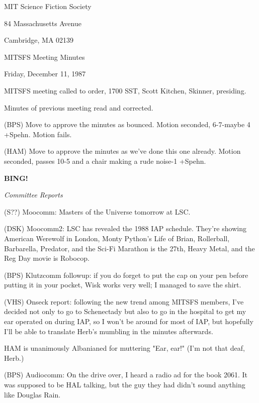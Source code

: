 \documentclass[12pt]{article}
\newcommand{\bing}{{\bf BING!} }
\newcommand{\goto}[1]{\bing \vskip 12pt \centerline{{\em{#1}}}}
\begin{document}
\begin{center}

MIT Science Fiction Society 

84 Massachusetts Avenue

Cambridge, MA 02139

\vspace{12pt}

MITSFS Meeting Minutes 

Friday, December 11, 1987

\end{center}
 
\vspace{18pt}

\setlength{\parskip}{6pt}

\noindent
MITSFS meeting called to order, 1700 SST,
Scott Kitchen, Skinner, presiding.

Minutes of previous meeting read and corrected.

(BPS) Move to approve the minutes as bounced. Motion seconded, 6-7-maybe 4 +Spehn. Motion fails.

(HAM) Move to approve the minutes as we've done this one already. Motion seconded, passes 10-5 and a chair making a rude noise-1 +Spehn.

\goto{Committee Reports}

(S??) Moocomm: Masters of the Universe tomorrow at LSC.

(DSK) Moocomm2: LSC has revealed the 1988 IAP schedule. They're showing American Werewolf in London, Monty Python's Life of Brian, Rollerball, Barbarella, Predator, and the Sci-Fi Marathon is the 27th, Heavy Metal, and the Reg Day movie is Robocop.

(BPS) Klutzcomm followup: if you do forget to put the cap on your pen before putting it in your pocket, Wisk works very well; I managed to save the shirt.

(VHS) Onseck report: following the new trend among MITSFS members, I've decided not only to go to Schenectady but also to go in the hospital to get my ear operated on during IAP, so I won't be around for most of IAP, but hopefully I'll be able to translate Herb's mumbling in the minutes afterwards.

HAM is unanimously Albanianed for muttering "Ear, ear!" (I'm not that deaf, Herb.)

(BPS) Audiocomm: On the drive over, I heard a radio ad for the book 2061. It was supposed to be HAL talking, but the guy they had didn't sound anything like Douglas Rain.
\end{document}
